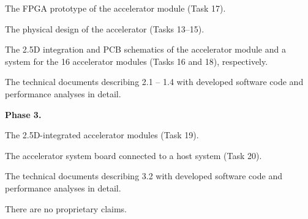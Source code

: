  The FPGA prototype of the accelerator module (Task 17).

 The physical design of the accelerator (Tasks 13--15).

 The 2.5D integration and PCB schematics of the accelerator module and a system for the 16 accelerator modules (Tasks 16 and 18), respectively.

 The technical documents describing 2.1 -- 1.4 with developed software code and performance analyses in detail.


\vspace{3pt}
\noindent
\textbf{Phase 3.}

 The 2.5D-integrated accelerator modules (Task 19).

 The accelerator system board connected to a host system (Task 20).

 The technical documents describing 3.2 with developed software code and performance analyses in detail.


\noindent
There are no proprietary claims.
